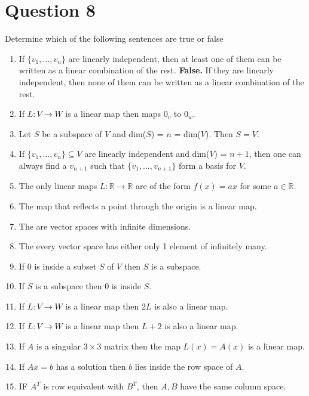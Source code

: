 \documentclass{article}
\begin{document}
\section*{Question 8}
Determine which of the following sentences are true or false
\begin{enumerate}
    \item If $\{v_1, ..., v_n\}$ are linearly independent, then at least one of them can be written as a linear combination of the rest.
        \newline\textbf{False.} If they are linearly independent, then none of them can be written as a linear combination of the rest.
    \item If $L:V \rightarrow W$ is a linear map then maps $0_v$ to $0_w$.\
    \item Let $S$ be a subspace of $V$ and dim($S$) = $n$ = dim($V$). Then $S = V$.
    \item If $\{v_1, ..., v_n\} \subseteq V$ are linearly independent and dim($V$) = $n + 1$, then one can always find a $v_{n+1}$ such that $\{v_1, ..., v_{n+1}\}$ form a basis for $V$.
    \item The only linear maps $L: \mathbb{R} \rightarrow \mathbb{R}$ are of the form $f(x) = ax$ for some $a \in \mathbb{R}$.
    \item The map that reflects a point through the origin is a linear map.
    \item The are vector spaces with infinite dimensions.
    \item The every vector space has either only 1 element of infinitely many.
    \item If 0 is inside a subset $S$ of $V$ then $S$ is a subspace.
    \item If $S$ is a subspace then 0 is inside $S$.
    \item If $L:V \rightarrow W$ is a linear map then $2L$ is also a linear map.
    \item If $L:V \rightarrow W$ is a linear map then $L + 2$ is also a linear map.
    \item If $A$ is a singular $3 \times 3$ matrix then the map $L(x) = A(x)$ is a linear map.
    \item If $Ax = b$ has a solution then $b$ lies inside the row space of $A$.
    \item IF $A^T$ is row equivalent with $B^T$, then $A, B$ have the same column space.
\end{enumerate}
\end{document}
